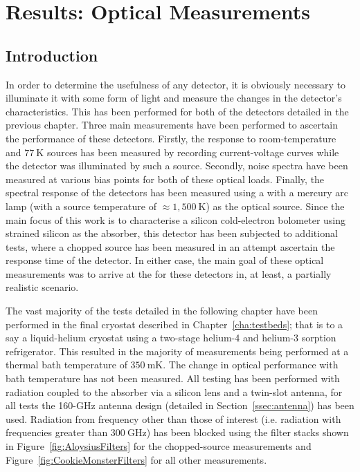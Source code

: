 \chapter{Results: Optical Measurements}
\label{cha:opticalResults}
\section{Introduction}\label{sec:opticalresults_introduction}
In order to determine the usefulness of any detector, it is obviously necessary to illuminate it with some form of light and measure the changes in the detector's characteristics. This has been performed for both of the detectors detailed in the previous chapter. Three main measurements have been performed to ascertain the performance of these detectors. Firstly, the response to room-temperature and $77~\mathrm{K}$ sources has been measured by recording current-voltage curves while the detector was illuminated by such a source. Secondly, noise spectra have been measured at various bias points for both of these optical loads. Finally, the spectral response of the detectors has been measured using a  with a mercury arc lamp (with a source temperature of $\approx 1,500~\mathrm{K}$) as the optical source. Since the main focus of this work is to characterise a silicon cold-electron bolometer using strained silicon as the absorber, this detector has been subjected to additional tests, where a chopped source has been measured in an attempt ascertain the response time of the detector. In either case, the main goal of these optical measurements was to arrive at the  for these detectors in, at least, a partially realistic scenario.
\par 
The vast majority of the tests detailed in the following chapter have been performed in the final cryostat described in Chapter~\ref{cha:testbeds}; that is to a say a liquid-helium cryostat using a two-stage helium-4 and helium-3 sorption refrigerator. This resulted in the majority of measurements being performed at a thermal bath temperature of $350~\mathrm{mK}$. The change in optical performance with bath temperature has not been measured. All testing has been performed with radiation coupled to the absorber via a silicon lens and a twin-slot antenna, for all tests the 160-GHz antenna design (detailed in Section~\ref{ssec:antenna}) has been used. Radiation from frequency other than those of interest (i.e. radiation with frequencies greater than $300~\mathrm{GHz}$) has been blocked using the filter stacks shown in Figure~\ref{fig:AloysiusFilters} for the chopped-source measurements and Figure~\ref{fig:CookieMonsterFilters} for all other measurements.
%
